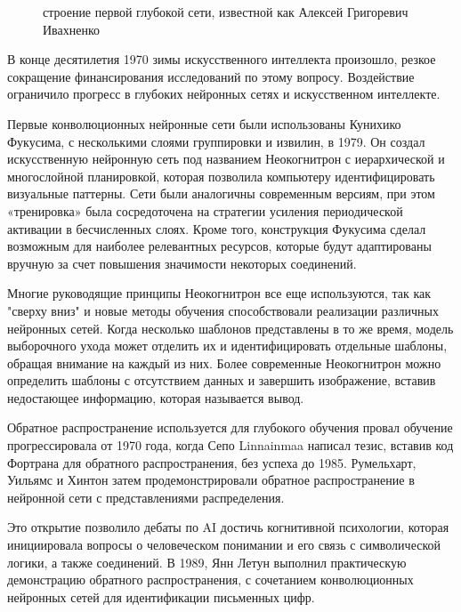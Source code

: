 \begin{figure*}[h]
    \caption{строение первой глубокой сети, известной как Алексей Григоревич Ивахненко}
\end{figure*}

 В конце десятилетия 1970 зимы искусственного интеллекта произошло, 
 резкое сокращение финансирования исследований по этому вопросу.
 Воздействие ограничило прогресс в глубоких нейронных сетях и искусственном интеллекте. 

 Первые конволюционных нейронные сети были использованы Кунихико Фукусима, 
 с несколькими слоями группировки и извилин, в 1979. 
 Он создал искусственную нейронную сеть под названием Неокогнитрон 
 с иерархической и многослойной планировкой,
 которая позволила компьютеру идентифицировать визуальные паттерны. 
 Сети были аналогичны современным версиям, при этом «тренировка» была сосредоточена на стратегии усиления периодической активации в бесчисленных слоях. 
 Кроме того, конструкция Фукусима сделал возможным для наиболее релевантных ресурсов, 
 которые будут адаптированы вручную за счет повышения значимости некоторых соединений. 

 Многие руководящие принципы Неокогнитрон все еще используются,
 так как "сверху вниз" и новые методы обучения способствовали реализации различных нейронных сетей.
 Когда несколько шаблонов представлены в то же время, модель выборочного ухода может отделить их и идентифицировать отдельные шаблоны, 
 обращая внимание на каждый из них. Более современные Неокогнитрон можно определить шаблоны с отсутствием данных и завершить изображение, 
 вставив недостающее информацию, которая называется вывод. 

 Обратное распространение используется для глубокого обучения провал обучение прогрессировала от 1970 года, 
 когда Сепо Linnainmaa написал тезис, вставив код Фортрана для обратного распространения, без успеха до 1985.
 Румельхарт, Уильямс и Хинтон затем продемонстрировали обратное распространение в нейронной сети с представлениями распределения. 

 Это открытие позволило дебаты по AI достичь когнитивной психологии,
 которая инициировала вопросы о человеческом понимании и его связь с символической логики, 
 а также соединений. В 1989, Янн Летун выполнил практическую демонстрацию обратного распространения,
 с сочетанием конволюционных нейронных сетей для идентификации письменных цифр.

